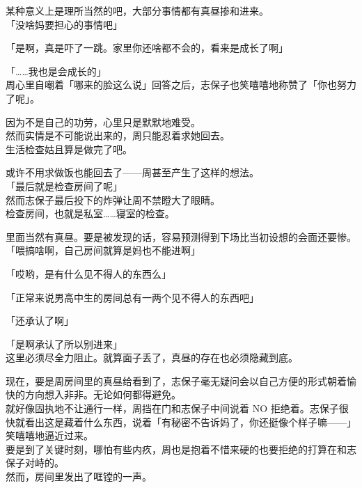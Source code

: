 某种意义上是理所当然的吧，大部分事情都有真昼掺和进来。\\

「没啥妈要担心的事情吧」

「是啊，真是吓了一跳。家里你还啥都不会的，看来是成长了啊」

「……我也是会成长的」\\

周心里自嘲着「哪来的脸这么说」回答之后，志保子也笑嘻嘻地称赞了「你也努力了呢」。

因为不是自己的功劳，心里只是默默地难受。\\

然而实情是不可能说出来的，周只能忍着求她回去。\\

生活检查姑且算是做完了吧。

或许不用求做饭也能回去了——周甚至产生了这样的想法。\\

「最后就是检查房间了呢」\\

然而志保子最后投下的炸弹让周不禁瞪大了眼睛。\\

检查房间，也就是私室……寝室的检查。

里面当然有真昼。要是被发现的话，容易预测得到下场比当初设想的会面还要惨。\\

「喂搞啥啊，自己房间就算是妈也不能进啊」

「哎哟，是有什么见不得人的东西么」

「正常来说男高中生的房间总有一两个见不得人的东西吧」

「还承认了啊」

「是啊承认了所以别进来」\\

这里必须尽全力阻止。就算面子丢了，真昼的存在也必须隐藏到底。

现在，要是周房间里的真昼给看到了，志保子毫无疑问会以自己方便的形式朝着愉快的方向想入非非。无论如何都得避免。\\

就好像固执地不让通行一样，周挡在门和志保子中间说着 NO 拒绝着。志保子很快就看出这是藏着什么东西，说着「有秘密不告诉妈了，你还挺像个样子嘛——」笑嘻嘻地逼近过来。\\

要是到了关键时刻，哪怕有些内疚，周也是抱着不惜来硬的也要拒绝的打算在和志保子对峙的。\\

然而，房间里发出了哐镗的一声。\\

